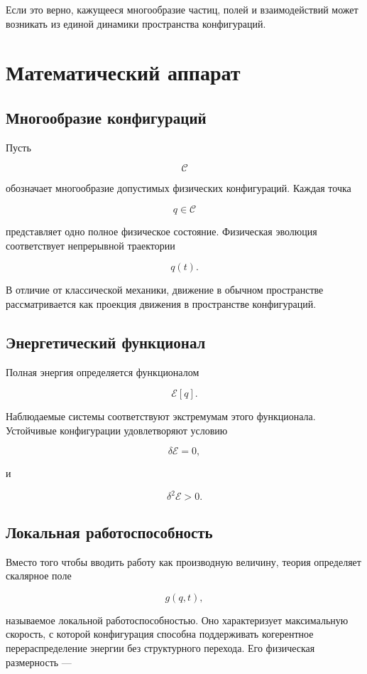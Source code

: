 Если это верно, кажущееся многообразие частиц, полей и взаимодействий может возникать из единой динамики пространства конфигураций.

\chapter{Математический аппарат}

\section{Многообразие конфигураций}

Пусть

\[ \mathcal{C} \]

обозначает многообразие допустимых физических конфигураций. Каждая точка

\[ q \in \mathcal C \]

представляет одно полное физическое состояние. Физическая эволюция соответствует непрерывной траектории

\[ q(t). \]

В отличие от классической механики, движение в обычном пространстве рассматривается как проекция движения в пространстве конфигураций.

\section{Энергетический функционал}

Полная энергия определяется функционалом

\[ \boxed{\mathcal E[q]}. \]

Наблюдаемые системы соответствуют экстремумам этого функционала. Устойчивые конфигурации удовлетворяют условию

\[ \delta\mathcal E=0, \]

и

\[ \delta^2\mathcal E>0. \]

\section{Локальная работоспособность}

Вместо того чтобы вводить работу как производную величину, теория определяет скалярное поле

\[ g(q,t), \]

называемое локальной работоспособностью. Оно характеризует максимальную скорость, с которой конфигурация способна поддерживать когерентное перераспределение энергии без структурного перехода. Его физическая размерность —

